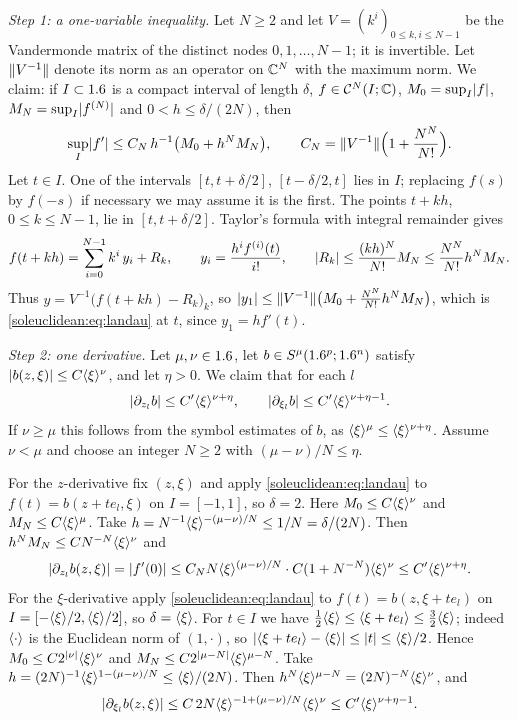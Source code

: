 \emph{Step 1: a one-variable inequality.}
Let $N\ge2$ and let $V=(k^i)_{0\le k,i\le N-1}$ be the Vandermonde matrix of the
distinct nodes $0,1,\dots,N-1$; it is invertible. Let $\lVert V^{-1}\rVert$ denote its norm as
an operator on $\mathbb{C}^N$ with the maximum norm. We claim: if $I\subset1.6$ is a compact
interval of length $\delta$, $f\in\mathcal C^N(I;\mathbb{C})$, $M_0=\sup_I\lvert f\rvert$,
$M_N=\sup_I\lvert f^{(N)}\rvert$ and $0<h\le\delta/(2N)$, then
\begin{equation}\label{soleuclidean:eq:landau}
  \sup_I\lvert f'\rvert\le C_N\,h^{-1}\bigl(M_0+h^NM_N\bigr),\qquad
  C_N=\lVert V^{-1}\rVert\Bigl(1+\frac{N^N}{N!}\Bigr).
\end{equation}
Let $t\in I$. One of the intervals $[t,t+\delta/2]$, $[t-\delta/2,t]$ lies in $I$;
replacing $f(s)$ by $f(-s)$ if necessary we may assume it is the first. The points
$t+kh$, $0\le k\le N-1$, lie in $[t,t+\delta/2]$. Taylor's formula with integral
remainder gives
\begin{equation*}
  f(t+kh)=\sum_{i=0}^{N-1}k^i\,y_i+R_k,\qquad y_i=\frac{h^if^{(i)}(t)}{i!},\qquad
  \lvert R_k\rvert\le\frac{(kh)^N}{N!}M_N\le\frac{N^N}{N!}h^NM_N .
\end{equation*}
Thus $y=V^{-1}\bigl(f(t+kh)-R_k\bigr)_{k}$, so
$\lvert y_1\rvert\le\lVert V^{-1}\rVert\bigl(M_0+\frac{N^N}{N!}h^NM_N\bigr)$, which is
\eqref{soleuclidean:eq:landau} at $t$, since $y_1=hf'(t)$.

\emph{Step 2: one derivative.} Let $\mu,\nu\in1.6$, let $b\in S^\mu(1.6^p;1.6^n)$ satisfy
$\lvert b(z,\xi)\rvert\le C\langle \xi\rangle^{\nu}$, and let $\eta>0$. We claim that for each
$l$
\begin{equation}\label{soleuclidean:eq:one-step}
  \lvert \partial_{z_l}b\rvert\le C'\langle \xi\rangle^{\nu+\eta},\qquad
  \lvert \partial_{\xi_l}b\rvert\le C'\langle \xi\rangle^{\nu+\eta-1}.
\end{equation}
If $\nu\ge\mu$ this follows from the symbol estimates of $b$, as
$\langle \xi\rangle^\mu\le\langle \xi\rangle^{\nu+\eta}$. Assume $\nu<\mu$ and choose an integer $N\ge2$ with
$(\mu-\nu)/N\le\eta$.

For the $z$-derivative fix $(z,\xi)$ and apply \eqref{soleuclidean:eq:landau} to
$f(t)=b(z+te_l,\xi)$ on $I=[-1,1]$, so $\delta=2$. Here $M_0\le C\langle \xi\rangle^\nu$ and
$M_N\le C\langle \xi\rangle^\mu$. Take $h=N^{-1}\langle \xi\rangle^{-(\mu-\nu)/N}\le1/N=\delta/(2N)$. Then
$h^NM_N\le CN^{-N}\langle \xi\rangle^{\nu}$ and
\begin{equation*}
  \lvert \partial_{z_l}b(z,\xi)\rvert=\lvert f'(0)\rvert\le C_NN\langle \xi\rangle^{(\mu-\nu)/N}\cdot C(1+N^{-N})\langle \xi\rangle^\nu
  \le C'\langle \xi\rangle^{\nu+\eta}.
\end{equation*}
For the $\xi$-derivative apply \eqref{soleuclidean:eq:landau} to $f(t)=b(z,\xi+te_l)$ on
$I=[-\langle \xi\rangle/2,\langle \xi\rangle/2]$, so $\delta=\langle \xi\rangle$. For $t\in I$ we have
$\frac12\langle \xi\rangle\le\langle \xi+te_l\rangle\le\frac32\langle \xi\rangle$; indeed $\langle \cdot\rangle$ is the Euclidean
norm of $(1,\cdot)$, so $\lvert \langle \xi+te_l\rangle-\langle \xi\rangle\rvert\le\lvert t\rvert\le\langle \xi\rangle/2$. Hence
$M_0\le C2^{\lvert \nu\rvert}\langle \xi\rangle^\nu$ and $M_N\le C2^{\lvert \mu-N\rvert}\langle \xi\rangle^{\mu-N}$. Take
$h=(2N)^{-1}\langle \xi\rangle^{1-(\mu-\nu)/N}\le\langle \xi\rangle/(2N)$. Then
$h^N\langle \xi\rangle^{\mu-N}=(2N)^{-N}\langle \xi\rangle^{\nu}$, and
\begin{equation*}
  \lvert \partial_{\xi_l}b(z,\xi)\rvert\le C\,2N\langle \xi\rangle^{-1+(\mu-\nu)/N}\langle \xi\rangle^{\nu}
  \le C'\langle \xi\rangle^{\nu+\eta-1}.
\end{equation*}

